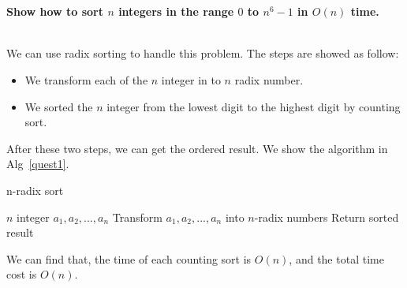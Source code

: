 
\chapter{}
\textbf{
Show how to sort $n$ integers in the range $0$ to $n^6-1$ in $O(n)$ time.
}

\hspace*{\fill} \\
We can use radix sorting to handle this problem. The steps are showed as follow:
\begin{itemize}
  \item We transform each of the $n$ integer in to $n$ radix number.
  \item We sorted the $n$ integer from the lowest digit to the highest digit by counting sort.
\end{itemize}

After these two steps, we can get the ordered result. We show the algorithm in Alg~\ref{quest1}.
\begin{algorithm}
\caption{n-radix sort}
\label{quest1}
\begin{algorithmic}[1]
\REQUIRE $n$ integer $a_1, a_2, ..., a_n$
\STATE Transform $a_1, a_2, ..., a_n$ into $n$-radix numbers
\ENDFOR
\STATE Return sorted result
\end{algorithmic}
\end{algorithm}

We can find that, the time of each counting sort is $O(n)$, and the total time cost is $O(n)$.
